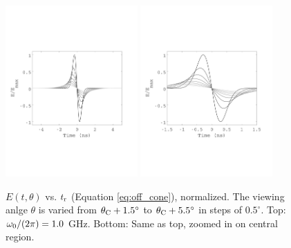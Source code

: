 \documentclass[amsmath,amssymb,aps,prd,10pt,twocolumn]{revtex4}
\begin{document}
\begin{figure}
\centering
\includegraphics[width=0.45\textwidth,trim=0cm 6cm 0cm 7cm,clip=true]{May5_plot1.pdf}
\includegraphics[width=0.45\textwidth,trim=0cm 6cm 0cm 7cm,clip=true]{May5_plot2.pdf}
\caption{\label{fig:off_cone} $E(t,\theta)$ vs. $t_{\rm r}$ (Equation \ref{eq:off_cone}), normalized.  The viewing anlge $\theta$ is varied from $\theta_{\rm C}+1.5^{\circ}$ to $\theta_{\rm C}+5.5^{\circ}$ in steps of $0.5^{\circ}$.  Top: $\omega_{\rm 0}/(2\pi) = 1.0$ GHz.  Bottom: Same as top, zoomed in on central region.}
\end{figure}
\end{document}
